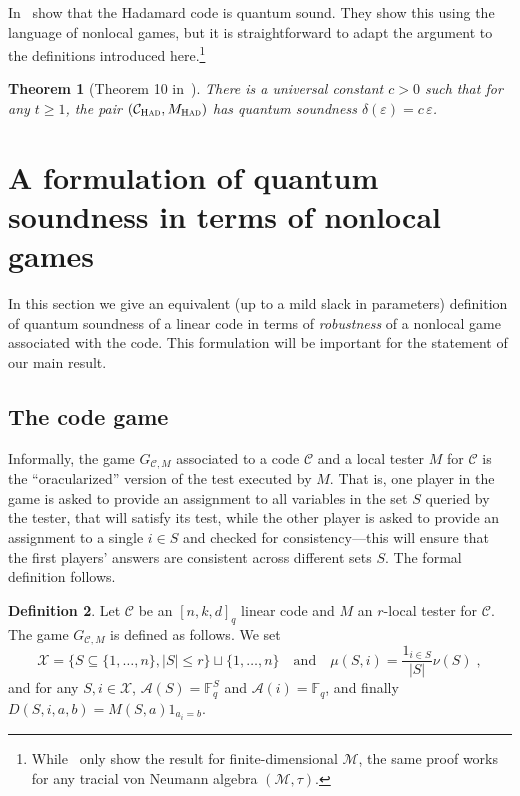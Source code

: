 \documentclass[11pt]{article}
\newtheorem{theorem}{Theorem}[section]
\theoremstyle{definition}
\newtheorem{definition}[theorem]{Definition}
\newcommand{\code}{\mathcal{C}}
\newcommand{\field}{\mathbb{F}_2}
\newcommand{\F}{\ensuremath{\mathbb{F}}}
\newcommand{\mA}{\ensuremath{\mathcal{A}}}
\newcommand{\mM}{\ensuremath{\mathcal{M}}}
\newcommand{\mX}{\ensuremath{\mathcal{X}}}
\newcommand{\Had}{\ensuremath{\textsc{Had}}}
\newcommand{\had}{\textsc{Had}}
\newcommand{\eps}{\varepsilon}
\begin{document}

In~\cite{natarajan2016robust} show that the Hadamard code is quantum sound. They show this using the language of nonlocal games, but it is straightforward to adapt the argument to the definitions introduced here.\footnote{While~\cite{natarajan2016robust} only show the result for finite-dimensional $\mM$, the same proof works for any tracial von Neumann algebra $(\mM,\tau)$.}
 
\begin{theorem}[Theorem 10 in~\cite{natarajan2016robust}]\label{thm:had-qsound}
There is a universal constant $c>0$ such that for any $t\geq 1$, the pair $(\code_\Had,M_\had)$ has quantum soundness $\delta(\eps)=c\,\eps$.
\end{theorem}


\section{A formulation of quantum soundness in terms of nonlocal games}

In this section we give an equivalent (up to a mild slack in parameters) definition of quantum soundness of a linear code in terms of \emph{robustness} of a nonlocal game associated with the code. This formulation will be important for the statement of our main result. 

\subsection{The code game}

Informally, the game $G_{\code,M}$ associated to a code $\code$ and a local tester $M$ for $\code$ is the ``oracularized'' version of the test executed by $M$. That is, one player in the game is asked to provide an assignment to all variables in the set $S$ queried by the tester, that will satisfy its test, while the other player is asked to provide an assignment to a single $i\in S$ and checked for consistency---this will ensure that the first players' answers are consistent across different sets $S$. The formal definition follows.  

\begin{definition}
Let $\code$ be an $[n,k,d]_q$ linear code and $M$ an $r$-local tester for $\code$. The game $G_{\code,M}$ is defined as follows. We set 
\[\mX = \{ S\subseteq \{1,\ldots,n\},|S|\leq r\} \sqcup\{1,\ldots,n\}\quad\text{and}\quad \mu(S,i)=\frac{1_{i\in S}}{|S|}\nu(S)\;,\]
and for any $S,i\in\mX$, $\mA(S)=\F_q^S$ and $\mA(i)=\F_q$, and finally $D(S,i,a,b)=M(S,a)1_{a_i=b}$. 
\end{definition}
\end{document}
